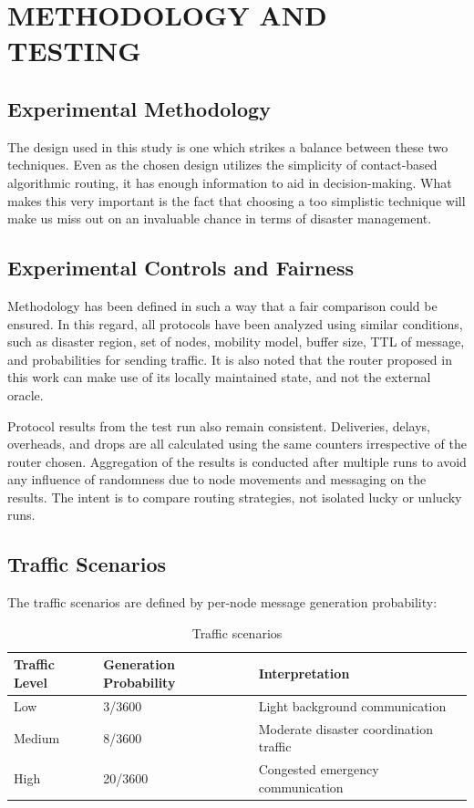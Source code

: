 \chapter{\MakeUppercase{Methodology and Testing}}

\section{Experimental Methodology}
The design used in this study is one which strikes a balance between these two techniques. Even as the chosen design utilizes the simplicity of contact-based algorithmic routing, it has enough information to aid in decision-making. What makes this very important is the fact that choosing a too simplistic technique will make us miss out on an invaluable chance in terms of disaster management.

\section{Experimental Controls and Fairness}
Methodology has been defined in such a way that a fair comparison could be ensured. In this regard, all protocols have been analyzed using similar conditions, such as disaster region, set of nodes, mobility model, buffer size, TTL of message, and probabilities for sending traffic. It is also noted that the router proposed in this work can make use of its locally maintained state, and not the external oracle.

Protocol results from the test run also remain consistent. Deliveries, delays, overheads, and drops are all calculated using the same counters irrespective of the router chosen. Aggregation of the results is conducted after multiple runs to avoid any influence of randomness due to node movements and messaging on the results. The intent is to compare routing strategies, not isolated lucky or unlucky runs.

\section{Traffic Scenarios}
The traffic scenarios are defined by per-node message generation probability:

\begin{table}[h!]
	\centering
	\caption{Traffic scenarios}
	\renewcommand{\arraystretch}{1.3}
	\begin{tabular}{|l|l|l|}
		\hline
		\textbf{Traffic Level} & \textbf{Generation Probability} & \textbf{Interpretation} \\
		\hline
		Low & 3/3600 & Light background communication \\
		\hline
		Medium & 8/3600 & Moderate disaster coordination traffic \\
		\hline
		High & 20/3600 & Congested emergency communication \\
		\hline
	\end{tabular}
	\label{tab:traffic_scenarios}
\end{table}

